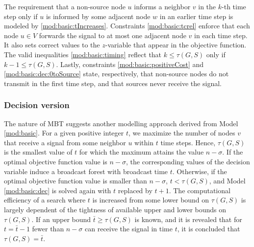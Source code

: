 The requirement that a non-source node $u$ informs a neighbor $v$ in the $k$-th time step only if $u$ is informed by some adjacent node $w$ in an earlier time step is modeled by \eqref{mod:basic:tIncreases}. 
Constraints \eqref{mod:basic:tcrel} enforce that each node $u\in V$ forwards the signal to at most one adjacent node $v$ in each time step.
It also sets correct values to the $z$-variable that appear in the objective function.
The valid inequalities \ref{mod:basic:timing} reflect that $k\leq\tau(G,S)$ only if $k-1\leq\tau(G,S)$.
Lastly, constraints \eqref{mod:basic:positiveCost} and \eqref{mod:basic:dec:0toSource} state, respectively, that non-source nodes do not transmit in the first time step,
and that sources never receive the signal.

\subsubsection{Decision version}
\label{sec:decbasic}
The nature of MBT suggests another modelling approach derived from Model \eqref{mod:basic}. 
For a given positive integer $t$, we maximize the number of nodes $v$ that receive a signal from some neighbor $u$ within $t$ time steps.
Hence, $\tau(G,S)$ is the smallest value of $t$ for which the maximum attains the value $n-\sigma$.
If the optimal objective function value is $n-\sigma$, the corresponding values of the decision variable induce a broadcast forest with broadcast time $t$.
Otherwise, if the optimal objective function value is smaller than $n-\sigma$, $t<\tau(G,S)$, and Model \eqref{mod:basic:dec} is solved again with $t$ replaced by $t+1$.
The computational efficiency of a search where $t$ is increased from some lower bound on $\tau(G,S)$ is largely dependent of the tightness of available upper and lower bounds on $\tau(G,S)$.
If an upper bound $\bar{t}\geq \tau(G,S)$ is known, and it is revealed that for $t=\bar{t}-1$ fewer than $n-\sigma$ can receive the signal in time $t$, it is concluded that $\tau(G,S)=\bar{t}$.

